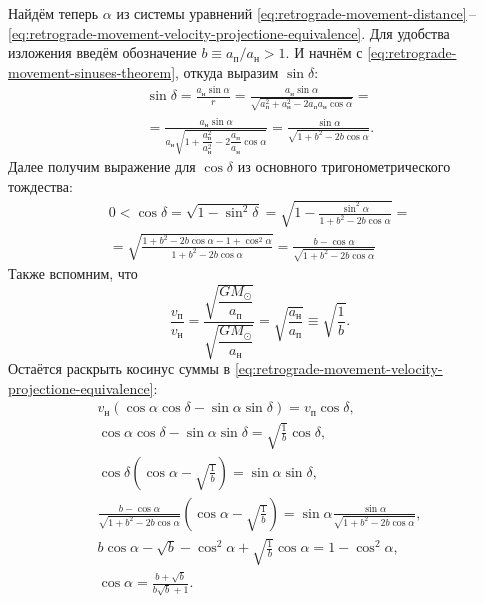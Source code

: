 Найдём теперь $\alpha$ из системы уравнений \eqref{eq:retrograde-movement-distance}\,--\,\eqref{eq:retrograde-movement-velocity-projectione-equivalence}. Для удобства изложения введём обозначение $b \equiv a_\text{п} / a_\text{н} > 1$. И начнём с \eqref{eq:retrograde-movement-sinuses-theorem}, откуда выразим $\sin \delta$:
\begin{multline*}
    \sin \delta 
        = \frac{a_\text{н} \sin \alpha}{r} 
        = \frac{a_\text{н} \sin \alpha}{\sqrt{a_\text{п}^2 + a_\text{н}^2 - 2 a_\text{п} a_\text{н} \cos \alpha}} = \\
        =  \frac{a_\text{н} \sin \alpha}{a_\text{н} \sqrt{1 + \dfrac{a_\text{п}^2}{a_\text{н}^2} - 2 \dfrac{a_\text{п}}{a_\text{н}} \cos \alpha}}
        = \frac{\sin \alpha}{\sqrt{1 + b^2 - 2 b \cos \alpha}}.
\end{multline*}
Далее получим выражение для $\cos \delta$ из основного тригонометрического тождества:
\begin{multline*}
    0 < \cos \delta 
        = \sqrt{1 - \sin^2 \delta} 
        = \sqrt{1 - \frac{\sin^2 \alpha}{1 + b^2 - 2 b \cos \alpha}} = \\
        = \sqrt{\frac{1 + b^2 - 2 b \cos \alpha - 1 + \cos^2 \alpha}{1 + b^2 - 2 b \cos \alpha}}
        = \frac{b - \cos \alpha}{\sqrt{1 + b^2 - 2 b \cos \alpha}}
\end{multline*}
Также вспомним, что
\begin{equation*}
    \frac{v_\text{п}}{v_\text{н}} = \frac{\sqrt{\dfrac{GM_\odot}{a_\text{п}}}}{\sqrt{\dfrac{GM_\odot}{a_\text{н}}}} = \sqrt{\frac{a_\text{н}}{a_\text{п}}} \equiv \sqrt{\frac{1}{b}}.
\end{equation*}
Остаётся раскрыть косинус суммы в \eqref{eq:retrograde-movement-velocity-projectione-equivalence}:
\begin{gather}
    v_\text{н} (\cos \alpha \cos \delta - \sin \alpha \sin \delta) = v_\text{п} \cos \delta,\nonumber\\
    \cos \alpha \cos \delta - \sin \alpha \sin \delta = \sqrt{\frac{1}{b}} \cos \delta,\nonumber\\
    \cos \delta \left( \cos \alpha - \sqrt{\frac{1}{b}} \right) = \sin \alpha \sin \delta,\nonumber\\
    \frac{b - \cos \alpha}{\sqrt{1 + b^2 - 2 b \cos \alpha}}\left( \cos \alpha - \sqrt{\frac{1}{b}} \right) = \sin \alpha \frac{\sin \alpha}{\sqrt{1 + b^2 - 2 b \cos \alpha}},\nonumber\\
    b \cos \alpha - \sqrt{b} - \cos^2 \alpha + \sqrt{\frac{1}{b}} \cos \alpha = 1 - \cos^2 \alpha,\nonumber\\
    \cos \alpha = \frac{b + \sqrt{b}}{b \sqrt{b} + 1}.
    \label{eq:retrograde-movement-alpha}
\end{gather}

